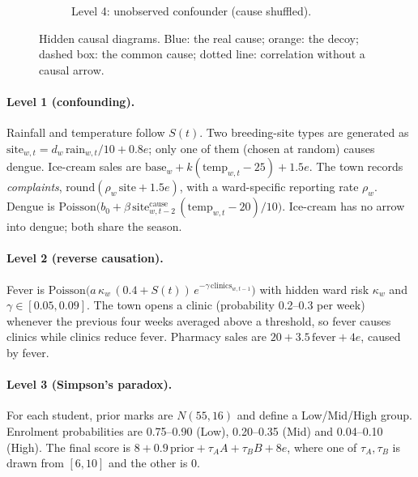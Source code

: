 \documentclass[11pt,a4paper]{article}
\begin{document}
\begin{figure}[H]
\begin{subfigure}[t]{0.49\textwidth}
\caption{Level 4: unobserved confounder (cause shuffled).}\end{subfigure}
\caption{Hidden causal diagrams. Blue: the real cause; orange: the decoy; dashed box: the common cause; dotted line:
correlation without a causal arrow.}
\label{fig:dags}
\end{figure}

\paragraph{Level 1 (confounding).} Rainfall and temperature follow $S(t)$. Two breeding-site types are generated as
$\text{site}_{w,t} = d_w\,\text{rain}_{w,t}/10 + 0.8e$; only one of them (chosen at random) causes dengue. Ice-cream sales are
$\text{base}_w + k(\text{temp}_{w,t}-25) + 1.5e$. The town records \emph{complaints}, $\text{round}(\rho_w\,\text{site} + 1.5e)$,
with a ward-specific reporting rate $\rho_w$. Dengue is
$\text{Poisson}\big(b_0 + \beta\,\text{site}^{\text{cause}}_{w,t-2}\,(\text{temp}_{w,t}-20)/10\big)$.
Ice-cream has no arrow into dengue; both share the season.

\paragraph{Level 2 (reverse causation).} Fever is $\text{Poisson}\big(a\,\kappa_w\,(0.4+S(t))\,e^{-\gamma\,\text{clinics}_{w,t-1}}\big)$
with hidden ward risk $\kappa_w$ and $\gamma\in[0.05,0.09]$. The town opens a clinic (probability 0.2--0.3 per week) whenever the
previous four weeks averaged above a threshold, so fever causes clinics while clinics reduce fever. Pharmacy sales are
$20 + 3.5\,\text{fever} + 4e$, caused by fever.

\paragraph{Level 3 (Simpson's paradox).} For each student, prior marks are $N(55,16)$ and define a Low/Mid/High group.
Enrolment probabilities are 0.75--0.90 (Low), 0.20--0.35 (Mid) and 0.04--0.10 (High). The final score is
$8 + 0.9\,\text{prior} + \tau_A A + \tau_B B + 8e$, where one of $\tau_A,\tau_B$ is drawn from $[6,10]$ and the other is 0.
\end{document}

